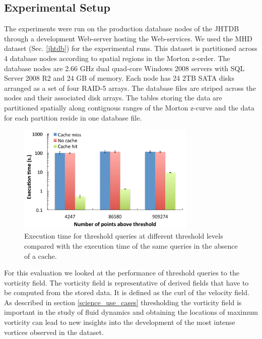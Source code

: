 \documentclass{sig-alternate}
\begin{document}
\subsection{Experimental Setup}
The experiments were run on the production database nodes of the JHTDB through a development Web-server hosting the Web-services. We used
the MHD dataset (Sec. \ref{jhtdb}) for the experimental runs. This dataset is partitioned across 4 database nodes according to spatial regions in the
Morton z-order. 
The database nodes are 2.66 GHz dual quad-core Windows 2008 servers with SQL Server 2008 R2 and 24 GB of memory. Each node has 24 2TB 
SATA disks arranged as a set of four RAID-5 arrays. The database files are striped across the nodes and their associated disk
arrays. The tables storing the data are partitioned spatially along contiguous ranges of the Morton z-curve and the data for each partition reside in one
database file. 

\begin{figure}
\centering
\includegraphics[width=3.35in]{Figures/cache_overhead.pdf}
\caption{Execution time for threshold queries at different threshold levels compared with the execution time of the same queries in the
absence of a cache.}
\label{fig:cache_overhead}
\end{figure}

For this evaluation we looked at the performance of threshold queries to the vorticity field. The vorticity field is representative of derived fields that
have to be computed from the stored data. It is defined as the curl of the velocity field.
As described in section \ref{science_use_cases}
thresholding the vorticity field is important in the study of fluid dynamics and obtaining the locations of maximum vorticity can lead to new insights into
the development of the most intense vortices observed in the dataset. 
\end{document}
